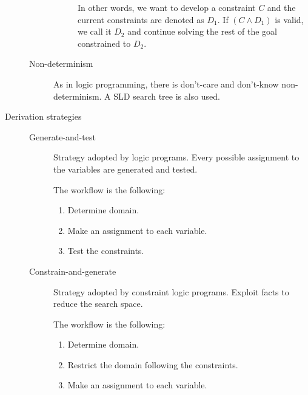 \begin{description}
\begin{description}
\begin{description}
                        In other words, we want to develop a constraint $C$ and the current constraints are denoted as $D_1$.
                        If $(C \land D_1)$ is valid, we call it $D_2$ and continue solving the rest of the goal constrained to $D_2$.
                \end{description}

            \item[Non-determinism]
                As in logic programming, there is don't-care and don't-know non-determinism. 
                A SLD search tree is also used.
        \end{description} 

    \item[Derivation strategies] \phantom{}
        \begin{description}
            \item[Generate-and-test] 
                Strategy adopted by logic programs.
                Every possible assignment to the variables are generated and tested.
                
                The workflow is the following:
                \begin{enumerate}
                    \item Determine domain.
                    \item Make an assignment to each variable.
                    \item Test the constraints.
                \end{enumerate}

            \item[Constrain-and-generate] 
                Strategy adopted by constraint logic programs.
                Exploit facts to reduce the search space.

                The workflow is the following:
                \begin{enumerate}
                    \item Determine domain.
                    \item Restrict the domain following the constraints.
                    \item Make an assignment to each variable.
                \end{enumerate}
        \end{description}
\end{description}